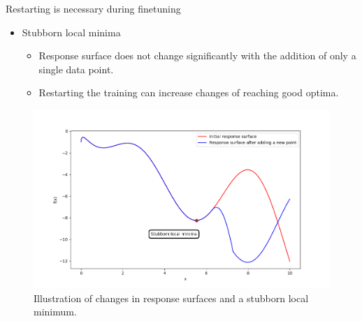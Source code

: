 \documentclass{beamer}
\begin{document}
\begin{frame}[t]{Restarting is necessary during finetuning}
\begin{itemize}
\item Stubborn local minima
\begin{itemize}
\item Response surface does not change significantly with the addition of only a single data point.
\item Restarting the training can increase changes of reaching good optima.
\end{itemize} 
\end{itemize}

\begin{figure}[htb]
  \centering
    \includegraphics[scale=0.37]{images/localMinima}
    \caption{Illustration of changes in response surfaces and a stubborn local minimum.}
    \label{fig:localMinima}
\end{figure}

\end{frame}
\end{document}
